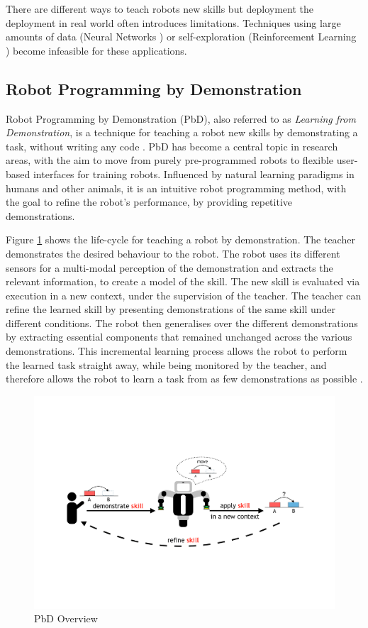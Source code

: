 There are different ways to teach robots new skills but deployment the deployment in real world often introduces limitations. 
Techniques using large amounts of data (Neural Networks \cite{billard2001robust}) or self-exploration (Reinforcement Learning \cite{smart2002effective}) become infeasible for these applications.

\subsection{Robot Programming by Demonstration}
Robot Programming by Demonstration (PbD), also referred to as \textit{Learning from Demonstration}, is a technique for teaching a robot new skills by demonstrating a task, without writing any code \cite{billard2008robot}.
PbD has become a central topic in research areas, with the aim to move from purely pre-programmed robots to flexible user-based interfaces for training robots.
Influenced by natural learning paradigms in humans and other animals, it is an intuitive robot programming method, with the goal to refine the robot's performance, by providing repetitive demonstrations.

Figure \ref{fig:Principle Overview} shows the life-cycle for teaching a robot by demonstration.
The teacher demonstrates the desired behaviour to the robot.
The robot uses its different sensors for a multi-modal perception of the demonstration and extracts the relevant information, to create a model of the skill.
The new skill is evaluated via execution in a new context, under the supervision of the teacher.
The teacher can refine the learned skill by presenting demonstrations of the same skill under different conditions.
The robot then generalises over the different demonstrations by extracting essential components that remained unchanged across the various demonstrations.
This incremental learning process allows the robot to perform the learned task straight away, while being monitored by the teacher, and therefore allows the robot to learn a task from as few demonstrations as possible \cite{billard2008robot}.

  \begin{figure}[h]
    \centering
    \includegraphics[scale=0.7]{figures/PbD-Overview}
    \caption{PbD Overview}
    \label{fig:Principle Overview}
  \end{figure}

